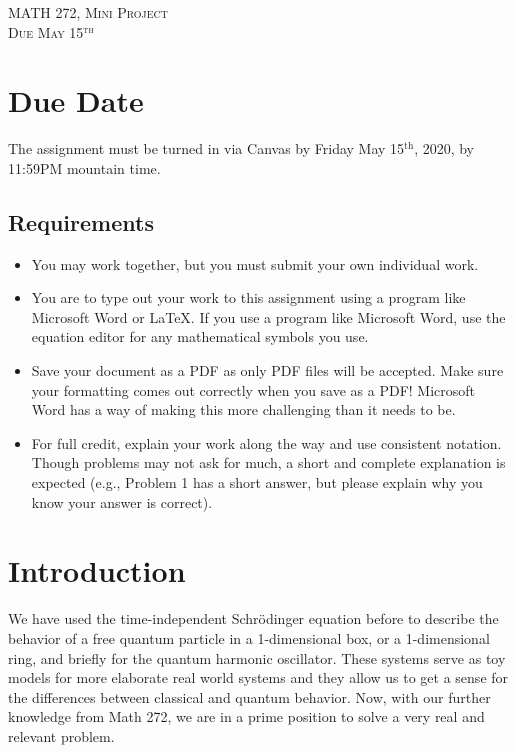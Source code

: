 \documentclass{article}
\begin{document}
\begin{center}
   \LARGE{\textsc{MATH 272, Mini Project}}\\
   \large{\textsc{Due May 15$^\textrm{th}$}}
\end{center}
\vspace{.5cm}


\section*{Due Date}
The assignment must be turned in via Canvas by Friday May 15$^\textrm{th}$, 2020, by 11:59PM mountain time.
\subsection*{Requirements}
\begin{itemize}
    \item You may work together, but you must submit your own individual work.
    \item You are to type out your work to this assignment using a program like Microsoft Word or \LaTeX. If you use a program like Microsoft Word, use the equation editor for any mathematical symbols you use. 
    \item Save your document as a PDF as only PDF files will be accepted. Make sure your formatting comes out correctly when you save as a PDF! Microsoft Word has a way of making this more challenging than it needs to be.
    \item For full credit, explain your work along the way and use consistent notation.  Though problems may not ask for much, a short and complete explanation is expected (e.g., Problem 1 has a short answer, but please explain why you know your answer is correct).
\end{itemize}


\section{Introduction}

We have used the time-independent Schr\"odinger equation before to describe the behavior of a free quantum particle in a 1-dimensional box, or a 1-dimensional ring, and briefly for the quantum harmonic oscillator.  These systems serve as toy models for more elaborate real world systems and they allow us to get a sense for the differences between classical and quantum behavior. Now, with our further knowledge from Math 272, we are in a prime position to solve a very real and relevant problem.
\end{document}

